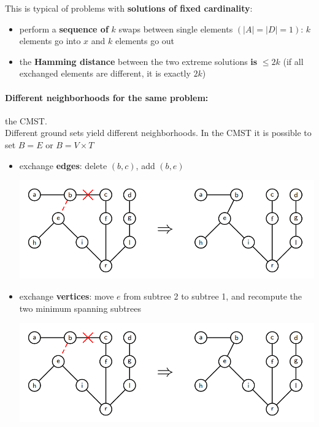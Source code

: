 \documentclass[11pt]{article}
\begin{document}
	This is typical of problems with \textbf{solutions of fixed cardinality}:
	\begin{itemize}
		\item perform a \textbf{sequence of} $k$ swaps between single elements $(|A| = |D| = 1)$: $k$ elements go into $x$ and $k$ elements go out
		
		\nn
		
		\item the \textbf{Hamming distance} between the two extreme solutions \textbf{is} $\leq 2k$ (if all exchanged elements are different, it is exactly $2k$)
	\end{itemize}
	
	\newpage
	
	\paragraph{Different neighborhoods for the same problem:} the CMST.\\
	
	Different ground sets yield different neighborhoods. In the CMST it is possible to set $B = E$ or $B = V \times T$
	\begin{itemize}
		\item exchange \textbf{edges}: delete $(b, c)$, add $(b, e)$
		\begin{center}
			\includegraphics[width=0.85\columnwidth]{img/CMST1}
		\end{center}
		\nn
		
		\item exchange \textbf{vertices}: move $e$ from subtree 2 to subtree 1, and recompute the two minimum spanning subtrees
		\begin{center}
			\includegraphics[width=0.85\columnwidth]{img/CMST1}
		\end{center}
	\end{itemize}
	
\end{document}
